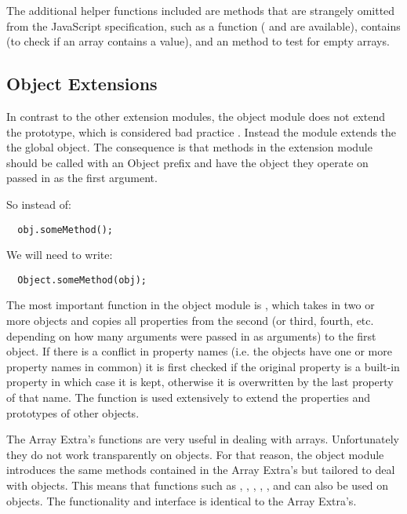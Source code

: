 The additional helper functions included are methods that are strangely omitted from the JavaScript specification, such as a  function ( and  are available), contains (to check if an array contains a value), and an  method to test for empty arrays.

\subsection{Object Extensions}
In contrast to the other extension modules, the object module does not extend the  prototype, which is considered bad practice \cite{arvidsson05}. Instead the module extends the the global  object. The consequence is that methods in the extension module should be called with an Object prefix and have the object they operate on passed in as the first argument.

So instead of:
\begin{verbatim}
  obj.someMethod();
\end{verbatim}
We will need to write:
\begin{verbatim}
  Object.someMethod(obj);
\end{verbatim}

The most important function in the object module is , which takes in two or more objects and copies all properties from the second (or third, fourth, etc. depending on how many arguments were passed in as arguments) to the first object. If there is a conflict in property names (i.e. the objects have one or more property names in common) it is first checked if the original property is a built-in property in which case it is kept, otherwise it is overwritten by the last property of that name. The  function is used extensively to extend the properties and prototypes of other objects.

The Array Extra's functions are very useful in dealing with arrays. Unfortunately they do not work transparently on objects. For that reason, the object module introduces the same methods contained in the Array Extra's but tailored to deal with objects. This means that functions such as , , , , , and  can also be used on objects. The functionality and interface is identical to the Array Extra's.

